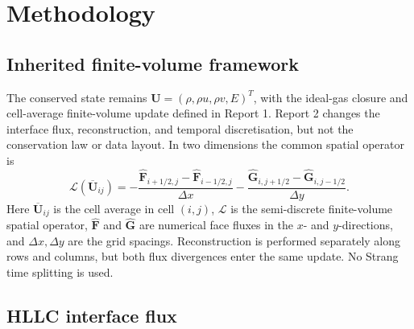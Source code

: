 \chapter{Methodology}
\label{chap:methodology}

\section{Inherited finite-volume framework}

The conserved state remains \(\mathbf U=(\rho,\rho u,\rho v,E)^T\), with the ideal-gas closure and cell-average finite-volume update defined in Report 1. Report 2 changes the interface flux, reconstruction, and temporal discretisation, but not the conservation law or data layout. In two dimensions the common spatial operator is
\begin{equation}
\mathcal L(\overline{\mathbf U}_{ij})=
-\frac{\widehat{\mathbf F}_{i+1/2,j}-\widehat{\mathbf F}_{i-1/2,j}}{\Delta x}
-\frac{\widehat{\mathbf G}_{i,j+1/2}-\widehat{\mathbf G}_{i,j-1/2}}{\Delta y}.
\label{eq:fvoperator}
\end{equation}
Here \(\overline{\mathbf U}_{ij}\) is the cell average in cell \((i,j)\),
\(\mathcal L\) is the semi-discrete finite-volume spatial operator,
\(\widehat{\mathbf F}\) and \(\widehat{\mathbf G}\) are numerical face fluxes in
the \(x\)- and \(y\)-directions, and \(\Delta x,\Delta y\) are the grid
spacings.
Reconstruction is performed separately along rows and columns, but both flux divergences enter the same update. No Strang time splitting is used.

\section{HLLC interface flux}
\label{sec:hllc}

